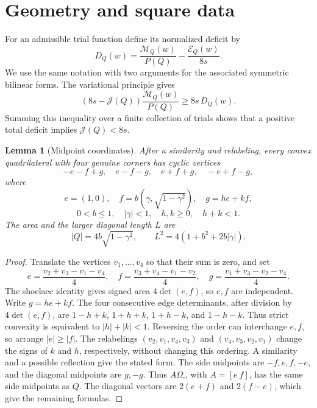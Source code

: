 \documentclass[11pt]{amsart}
\newtheorem{lemma}[theorem]{Lemma}
\theoremstyle{remark}\newtheorem{remark}[theorem]{Remark}
\numberwithin{equation}{section}
\begin{document}
\section{Geometry and square data}

For an admissible trial function define its normalized deficit by
\[
D_Q(w)=\frac{\mathcal M_Q(w)}{P(Q)}-
\frac{\mathcal E_Q(w)}{8s}.
\]
We use the same notation with two arguments for the associated symmetric
bilinear forms. The variational principle gives
\begin{equation}\label{eq-rayleigh-deficit}
(8s-\mathcal J(Q))\frac{\mathcal M_Q(w)}{P(Q)}
\ge8s\,D_Q(w).
\end{equation}
Summing this inequality over a finite collection of trials shows that
a positive total deficit implies $\mathcal J(Q)<8s$.

\begin{samepage}
\begin{lemma}[Midpoint coordinates]\label{lem-normal-form}
After a similarity and relabeling, every convex quadrilateral with four
genuine corners has cyclic vertices
\[
-e-f+g,\quad e-f-g,\quad e+f+g,\quad -e+f-g,
\]
where
\[
e=(1,0),\quad f=b(\gamma,\sqrt{1-\gamma^2}),\quad g=he+kf,
\]
\[
0<b\le1,\quad |\gamma|<1,\quad h,k\ge0,\quad h+k<1.
\]
The area and the larger diagonal length $L$ are
\[
|Q|=4b\sqrt{1-\gamma^2},\qquad
L^2=4(1+b^2+2b|\gamma|).
\]
\end{lemma}
\end{samepage}
\begin{proof}
Translate the vertices $v_1,\ldots,v_4$ so that their sum is zero, and set
\[
e=\frac{v_2+v_3-v_1-v_4}{4},\quad
f=\frac{v_3+v_4-v_1-v_2}{4},\quad
g=\frac{v_1+v_3-v_2-v_4}{4}.
\]
The shoelace identity gives signed area $4\det(e,f)$, so $e,f$ are
independent. Write $g=he+kf$. The four consecutive edge determinants,
after division by $4\det(e,f)$, are
$1-h+k$, $1+h+k$, $1+h-k$, and $1-h-k$.
Thus strict convexity is equivalent to $|h|+|k|<1$.
Reversing the order can interchange $e,f$, so arrange $|e|\ge|f|$.
The relabelings $(v_2,v_1,v_4,v_3)$ and $(v_4,v_3,v_2,v_1)$
change the signs of $k$ and $h$, respectively, without changing this
ordering. A similarity and a possible reflection give the stated form.
The side midpoints are $-f,e,f,-e$, and the diagonal midpoints are $g,-g$.
Thus $A\Omega_\square$, with $A=[e\ f]$, has the same side midpoints as $Q$.
The diagonal vectors are $2(e+f)$ and $2(f-e)$, which give the remaining formulas.
\end{proof}
\end{document}
